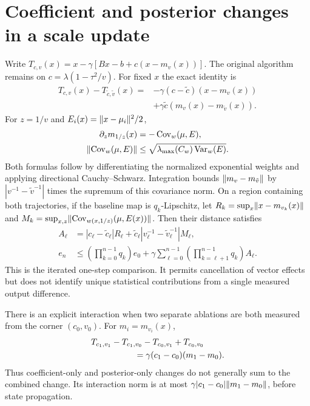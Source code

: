 \section{Coefficient and posterior changes in a scale update}
\label{sec:coefficient_split}
Write $T_{c,v}(x)=x-\gamma[Bx-b+c(x-m_v(x))]$.
The original algorithm remains on $c=\lambda(1-\tau^2/v)$.
For fixed $x$ the exact identity is
\begin{align}
 T_{c,v}(x)-T_{\tilde c,\tilde v}(x)
 ={}&-\gamma(c-\tilde c)(x-m_v(x))\nonumber\\
 &+\gamma\tilde c(m_v(x)-m_{\tilde v}(x)).
\end{align}
For $z=1/v$ and $E_i(x)=\lVert x-\mu_i\rVert^2/2$,
\begin{align*}
 \partial_z m_{1/z}(x)&=-\operatorname{Cov}_{w}(\mu,E),\\
 \lVert\operatorname{Cov}_w(\mu,E)\rVert
 &\le\sqrt{\lambda_{\max}(C_w)\operatorname{Var}_w(E)} .
\end{align*}
Both formulas follow by differentiating the normalized exponential
weights and applying directional Cauchy--Schwarz.
Integration bounds $\lVert m_v-m_{\tilde v}\rVert$ by
$|v^{-1}-\tilde v^{-1}|$ times the supremum of this covariance norm.
On a region containing both trajectories, if the baseline map is
$q_k$-Lipschitz, let
$R_k=\sup_x\lVert x-m_{v_k}(x)\rVert$ and
$M_k=\sup_{x,z}\lVert\operatorname{Cov}_{w(x,1/z)}(\mu,E(x))\rVert$.
Then their distance satisfies
\begin{align}
 A_\ell&=|c_\ell-\tilde c_\ell|R_\ell+
 \tilde c_\ell|v_\ell^{-1}-\tilde v_\ell^{-1}|M_\ell,\nonumber\\
 e_n&\le\left(\prod_{k=0}^{n-1}q_k\right)e_0
 +\gamma\sum_{\ell=0}^{n-1}
 \left(\prod_{k=\ell+1}^{n-1}q_k\right)A_\ell .
\end{align}
This is the iterated one-step comparison.
It permits cancellation of vector effects but does not identify
unique statistical contributions from a single measured output difference.

There is an explicit interaction when two separate ablations are
both measured from the corner $(c_0,v_0)$.
For $m_i=m_{v_i}(x)$,
\begin{align}
 &T_{c_1,v_1}-T_{c_1,v_0}-T_{c_0,v_1}+T_{c_0,v_0}\nonumber\\
 &\hspace{18mm}=\gamma(c_1-c_0)(m_1-m_0).
\end{align}
Thus coefficient-only and posterior-only changes do not generally
sum to the combined change. Its interaction norm is at most
$\gamma|c_1-c_0|\lVert m_1-m_0\rVert$, before state propagation.
